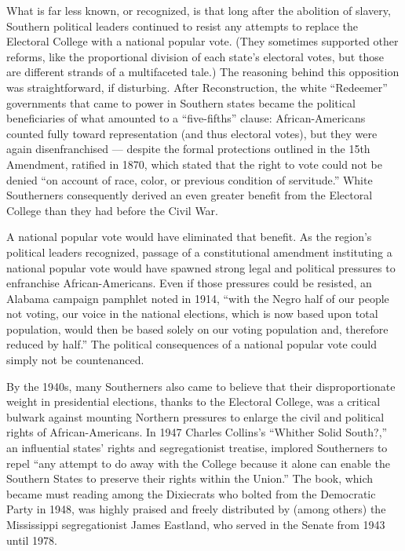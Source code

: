 What is far less known, or recognized, is that long after the abolition
of slavery, Southern political leaders continued to resist any attempts
to replace the Electoral College with a national popular vote. (They
sometimes supported other reforms, like the proportional division of
each state's electoral votes, but those are different strands of a
multifaceted tale.) The reasoning behind this opposition was
straightforward, if disturbing. After Reconstruction, the white
``Redeemer'' governments that came to power in Southern states became
the political beneficiaries of what amounted to a ``five-fifths''
clause: African-Americans counted fully toward representation (and thus
electoral votes), but they were again disenfranchised --- despite the
formal protections outlined in the 15th Amendment, ratified in 1870,
which stated that the right to vote could not be denied ``on account of
race, color, or previous condition of servitude.'' White Southerners
consequently derived an even greater benefit from the Electoral College
than they had before the Civil War.

A national popular vote would have eliminated that benefit. As the
region's political leaders recognized, passage of a constitutional
amendment instituting a national popular vote would have spawned strong
legal and political pressures to enfranchise African-Americans. Even if
those pressures could be resisted, an Alabama campaign pamphlet noted in
1914, ``with the Negro half of our people not voting, our voice in the
national elections, which is now based upon total population, would then
be based solely on our voting population and, therefore reduced by
half.'' The political consequences of a national popular vote could
simply not be countenanced.

By the 1940s, many Southerners also came to believe that their
disproportionate weight in presidential elections, thanks to the
Electoral College, was a critical bulwark against mounting Northern
pressures to enlarge the civil and political rights of
African-Americans. In 1947 Charles Collins's ``Whither Solid South?,''
an influential states' rights and segregationist treatise, implored
Southerners to repel ``any attempt to do away with the College because
it alone can enable the Southern States to preserve their rights within
the Union.'' The book, which became must reading among the Dixiecrats
who bolted from the Democratic Party in 1948, was highly praised and
freely distributed by (among others) the Mississippi segregationist
James Eastland, who served in the Senate from 1943 until 1978.

